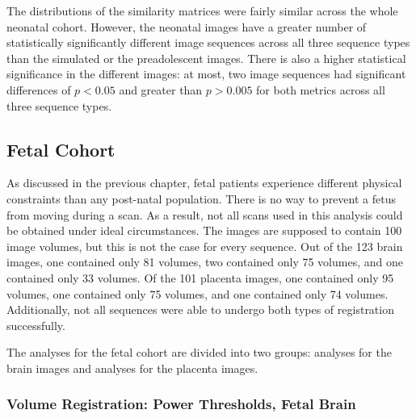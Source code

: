 The distributions of the similarity matrices were fairly similar across the whole neonatal cohort. However, the neonatal images have a greater number of statistically significantly different image sequences across all three sequence types than the simulated or the preadolescent images. There is also a higher statistical significance in the different images: at most, two image sequences had significant differences of $p < 0.05$ and greater than $p > 0.005$ for both metrics across all three sequence types.

\subsection{Fetal Cohort}

As discussed in the previous chapter, fetal patients experience different physical constraints than any post-natal population. There is no way to prevent a fetus from moving during a scan. As a result, not all scans used in this analysis could be obtained under ideal circumstances. The images are supposed to contain 100 image volumes, but this is not the case for every sequence. Out of the 123 brain images, one contained only 81 volumes, two contained only 75 volumes, and one contained only 33 volumes. Of the 101 placenta images, one contained only 95 volumes, one contained only 75 volumes, and one contained only 74 volumes. Additionally, not all sequences were able to undergo both types of registration successfully. 

The analyses for the fetal cohort are divided into two groups: analyses for the brain images and analyses for the placenta images. 

\subsubsection{Volume Registration: Power Thresholds, Fetal Brain}

